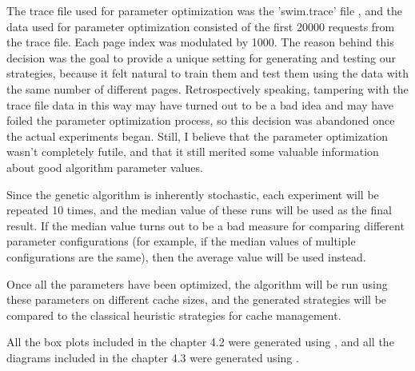 The trace file used for parameter optimization was the 'swim.trace' file \citep{data}, and the data used for parameter optimization consisted of the first 20000 requests from the trace file. Each page index was modulated by 1000. The reason behind this decision was the goal to provide a unique setting for generating and testing our strategies, because it felt natural to train them and test them using the data with the same number of different pages. Retrospectively speaking, tampering with the trace file data in this way may have turned out to be a bad idea and may have foiled the parameter optimization process, so this decision was abandoned once the actual experiments began. Still, I believe that the parameter optimization wasn't completely futile, and that it still merited some valuable information about good algorithm parameter values.

Since the genetic algorithm is inherently stochastic, each experiment will be repeated 10 times, and the median value of these runs will be used as the final result. If the median value turns out to be a bad measure for comparing different parameter configurations (for example, if the median values of multiple configurations are the same), then the average value will be used instead.

Once all the parameters have been optimized, the algorithm will be run using these parameters on different cache sizes, and the generated strategies will be compared to the classical heuristic strategies for cache management.

All the box plots included in the chapter 4.2 were generated using \citep{box}, and all the diagrams included in the chapter 4.3 were generated using \citep{box_plots}.
